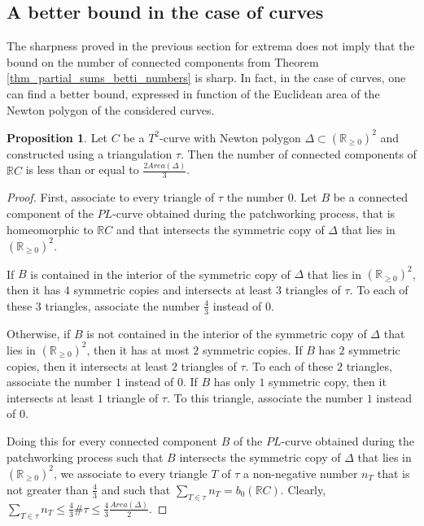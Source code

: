 \documentclass[12pt]{article}
\newcommand{\R}{\mathbb{R}}
\theoremstyle{definition}
\newtheorem{prop}{Proposition}[section]
\begin{document}
\subsection{A better bound in the case of curves}

\begin{sloppypar}
    The sharpness proved in the previous section for extrema does not imply that the bound on the number of connected components from Theorem \ref{thm_partial_sums_betti_numbers} is sharp. In fact, in the case of curves, one can find a better bound, expressed in function of the Euclidean area of the Newton polygon of the considered curves.
\end{sloppypar}

\begin{prop}
    \label{prop_better_bound_curves}
    Let $C$ be a $T^2$-curve with Newton polygon $\Delta \subset (\R_{\geq 0})^2$ and constructed using a triangulation $\tau$. Then the number of connected components of $\R C$ is less than or equal to $\frac{2Area(\Delta)}{3}$.
\end{prop}

\begin{proof}
    First, associate to every triangle of $\tau$ the number $0$. Let $B$ be a connected component of the $PL$-curve obtained during the patchworking process, that is homeomorphic to $\R C$ and that intersects the symmetric copy of $\Delta$ that lies in $(\R_{\geq0})^2$.

    If $B$ is contained in the interior of the symmetric copy of $\Delta$ that lies in $(\R_{\geq 0})^2$, then it has $4$ symmetric copies and intersects at least $3$ triangles of $\tau$. To each of these $3$ triangles, associate the number $\frac{4}{3}$ instead of $0$.

    Otherwise, if $B$ is not contained in the interior of the symmetric copy of $\Delta$ that lies in $(\R_{\geq0})^2$, then it has at most $2$ symmetric copies. If $B$ has $2$ symmetric copies, then it intersects at least $2$ triangles of $\tau$. To each of these $2$ triangles, associate the number $1$ instead of $0$. If $B$ has only $1$ symmetric copy, then it intersects at least $1$ triangle of $\tau$. To this triangle, associate the number $1$ instead of $0$.

    Doing this for every connected component $B$ of the $PL$-curve obtained during the patchworking process such that $B$ intersects the symmetric copy of $\Delta$ that lies in $(\R_{\geq 0})^2$, we associate to every triangle $T$ of $\tau$ a non-negative number $n_T$ that is not greater than $\frac{4}{3}$ and such that $\sum_{T \in \tau} n_T = b_0(\R C)$. Clearly, $\sum_{T \in \tau} n_T \leq \frac{4}{3} \#\tau \leq \frac{4}{3} \frac{Area(\Delta)}{2}$.
\end{proof}
\end{document}

